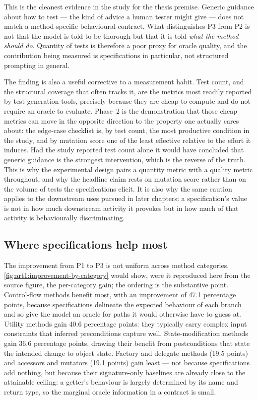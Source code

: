 This is the cleanest evidence in the study for the thesis premise. Generic
guidance about how to test --- the kind of advice a human tester might give ---
does not match a method-specific behavioural contract. What distinguishes P3 from
P2 is not that the model is told to be thorough but that it is told \emph{what the
method should do}. Quantity of tests is therefore a poor proxy for oracle quality,
and the contribution being measured is specifications in particular, not
structured prompting in general.

The finding is also a useful corrective to a measurement habit. Test count, and the
structural coverage that often tracks it, are the metrics most readily reported by
test-generation tools, precisely because they are cheap to compute and do not
require an oracle to evaluate. Phase~2 is the demonstration that those cheap
metrics can move in the opposite direction to the property one actually cares
about: the edge-case checklist is, by test count, the most productive condition in
the study, and by mutation score one of the least effective relative to the effort
it induces. Had the study reported test count alone it would have concluded that
generic guidance is the strongest intervention, which is the reverse of the truth.
This is why the experimental design pairs a quantity metric with a quality metric
throughout, and why the headline claim rests on mutation score rather than on the
volume of tests the specifications elicit. It is also why the same caution applies
to the downstream uses pursued in later chapters: a specification's value is not in
how much downstream activity it provokes but in how much of that activity is
behaviourally discriminating.

\subsection{Where specifications help most}
\label{sec:art1:by-category}

The improvement from P1 to P3 is not uniform across method categories.
\cref{fig:art1:improvement-by-category} would show, were it reproduced here from
the source figure, the per-category gain; the ordering is the substantive point.
Control-flow methods benefit most, with an improvement of 47.1 percentage points,
because specifications delineate the expected behaviour of each branch and so give
the model an oracle for paths it would otherwise have to guess at. Utility methods
gain 40.6 percentage points: they typically carry complex input constraints that
inferred preconditions capture well. State-modification methods gain 36.6
percentage points, drawing their benefit from postconditions that state the
intended change to object state. Factory and delegate methods (19.5 points) and
accessors and mutators (19.1 points) gain least --- not because specifications add
nothing, but because their signature-only baselines are already close to the
attainable ceiling: a getter's behaviour is largely determined by its name and
return type, so the marginal oracle information in a contract is small.

